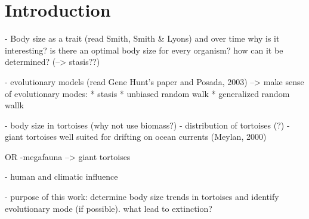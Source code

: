 \section{Introduction}

- Body size as a trait (read Smith, Smith \& Lyons) and over time
why is it interesting?
is there an optimal body size for every organism? how can it be determined? (--> stasis??)

- evolutionary models (read Gene Hunt's paper and Posada, 2003)
-->  make sense of evolutionary modes:
* stasis
* unbiased random walk
* generalized random wallk

- body size in tortoises (why not use biomass?)
- distribution of tortoises (?)
- giant tortoises well suited for drifting on ocean currents (Meylan, 2000)

OR
-megafauna --> giant tortoises

- human and climatic influence

- purpose of this work: determine body size trends in tortoises and identify evolutionary mode (if possible). what lead to extinction?



